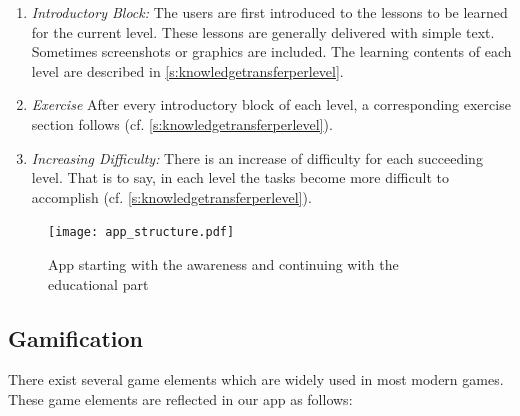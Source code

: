 \begin{enumerate}
\begin{enumerate}
	\item \textit{Introductory Block:} 
The users are first introduced to the lessons to be learned for the current level.
These lessons are generally delivered with simple text.
Sometimes screenshots or graphics are included.
 The learning contents of each level are described in \autoref{s:knowledgetransferperlevel}.
		\item \textit{Exercise} After every introductory block of each level, a corresponding exercise section follows (cf. \autoref{s:knowledgetransferperlevel}).
		\item \textit{Increasing Difficulty:} There is an increase of difficulty for each succeeding level.
 That is to say, in each level the tasks become more difficult to accomplish (cf. \autoref{s:knowledgetransferperlevel}).
\end{enumerate}
\end{enumerate}

\begin{figure}[hHtbp]
\centering
\texttt{[image: app\_structure.pdf]}
\caption{App starting with the awareness and continuing with the educational part}
\label{fig:app_structure}
\end{figure}


\subsection{Gamification}
\label{s:gamafication}
There exist several game elements which are widely used in most modern games.
These game elements are reflected in our app as follows:

